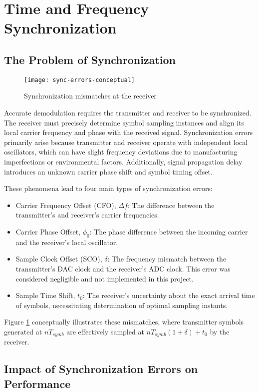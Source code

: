 \section{Time and Frequency Synchronization}
\subsection{The Problem of Synchronization}
\begin{figure}[H]
	\centering
	\texttt{[image: sync-errors-conceptual]} %
	\caption{Synchronization mismatches at the receiver}
	\label{fig:sync-errors-conceptual}
\end{figure}
Accurate demodulation requires the transmitter and receiver to be synchronized. The receiver must precisely determine symbol sampling instances and align its local carrier frequency and phase with the received signal. Synchronization errors primarily arise because transmitter and receiver operate with independent local oscillators, which can have slight frequency deviations due to manufacturing imperfections or environmental factors. Additionally, signal propagation delay introduces an unknown carrier phase shift and symbol timing offset.\par
These phenomena lead to four main types of synchronization errors:
\begin{itemize}
	\item Carrier Frequency Offset (CFO), $\Delta f$: The difference between the transmitter's and receiver's carrier frequencies.
	\item Carrier Phase Offset, $\phi_0$: The phase difference between the incoming carrier and the receiver's local oscillator.
	\item Sample Clock Offset (SCO), $\delta$: The frequency mismatch between the transmitter's DAC clock and the receiver's ADC clock. This error was considered negligible and not implemented in this project.
	\item Sample Time Shift, $t_0$: The receiver's uncertainty about the exact arrival time of symbols, necessitating determination of optimal sampling instants.
\end{itemize}
Figure \ref{fig:sync-errors-conceptual} conceptually illustrates these mismatches, where transmitter symbols generated at $nT_{symb}$ are effectively sampled at $nT_{symb}(1+\delta)+t_0$ by the receiver.


\subsection{Impact of Synchronization Errors on Performance}
